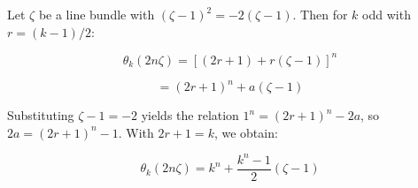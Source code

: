 Let $\zeta$ be a line bundle with $(\zeta - 1)^2 = -2(\zeta - 1)$. Then for $k$ odd with $r = (k-1)/2$:

$$
\theta_k(2n\zeta) = [(2r + 1) + r(\zeta - 1)]^n
$$

$$
= (2r + 1)^n + a(\zeta - 1)
$$

Substituting $\zeta - 1 = -2$ yields the relation $1^n = (2r + 1)^n - 2a$, so $2a = (2r+1)^n - 1$. With $2r + 1 = k$, we obtain:

$$
\theta_k(2n\zeta) = k^n + \frac{k^n - 1}{2}(\zeta - 1)
$$
